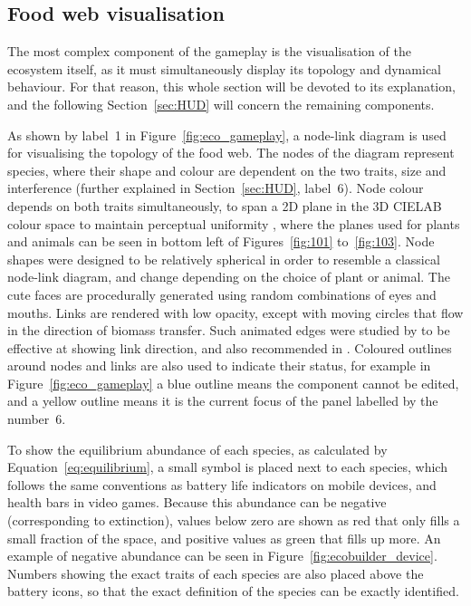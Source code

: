 \subsection{Food web visualisation}
\label{sec:eco_visualisation}
The most complex component of the gameplay is the visualisation of the ecosystem itself, as it must simultaneously display its topology and dynamical behaviour. For that reason, this whole section will be devoted to its explanation, and the following Section~\ref{sec:HUD} will concern the remaining components.

As shown by label~1 in Figure~\ref{fig:eco_gameplay}, a node-link diagram is used for visualising the topology of the food web.
The nodes of the diagram represent species, where their shape and colour are dependent on the two traits, size and interference (further explained in Section~\ref{sec:HUD}, label~6).
Node colour depends on both traits simultaneously, to span a 2D plane in the 3D CIELAB colour space to maintain perceptual uniformity \citep{Smart2019}, where the planes used for plants and animals can be seen in bottom left of Figures~\ref{fig:101} to~\ref{fig:103}.
Node shapes were designed to be relatively spherical in order to resemble a classical node-link diagram, and change depending on the choice of plant or animal. The cute faces are procedurally generated using random combinations of eyes and mouths.
Links are rendered with low opacity, except with moving circles that flow in the direction of biomass transfer. Such animated edges were studied by \citet{Holten2011} to be effective at showing link direction, and also recommended in \citet{Bach2017}.
Coloured outlines around nodes and links are also used to indicate their status, for example in Figure~\ref{fig:eco_gameplay} a blue outline means the component cannot be edited, and a yellow outline means it is the current focus of the panel labelled by the number~6.

To show the equilibrium abundance of each species, as calculated by Equation~\ref{eq:equilibrium}, a small symbol is placed next to each species, which follows the same conventions as battery life indicators on mobile devices, and health bars in video games. Because this abundance can be negative (corresponding to extinction), values below zero are shown as red that only fills a small fraction of the space, and positive values as green that fills up more. An example of negative abundance can be seen in Figure~\ref{fig:ecobuilder_device}.
Numbers showing the exact traits of each species are also placed above the battery icons, so that the exact definition of the species can be exactly identified.

